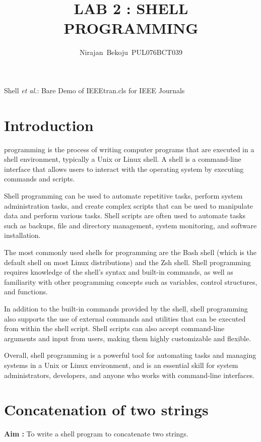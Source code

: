 \documentclass[journal,onecolumn]{IEEEtran}
\begin{document}
\title{LAB 2 : SHELL PROGRAMMING}

\author{Nirajan~Bekoju~PUL076BCT039}

%
{Shell \MakeLowercase{\textit{et al.}}: Bare Demo of IEEEtran.cls for IEEE Journals}

\maketitle

\IEEEpeerreviewmaketitle

\section{Introduction}
 programming is the process of writing computer programs that are executed in a shell environment, typically a Unix or Linux shell. A shell is a command-line interface that allows users to interact with the operating system by executing commands and scripts.

Shell programming can be used to automate repetitive tasks, perform system administration tasks, and create complex scripts that can be used to manipulate data and perform various tasks. Shell scripts are often used to automate tasks such as backups, file and directory management, system monitoring, and software installation.

The most commonly used shells for programming are the Bash shell (which is the default shell on most Linux distributions) and the Zsh shell. Shell programming requires knowledge of the shell's syntax and built-in commands, as well as familiarity with other programming concepts such as variables, control structures, and functions.

In addition to the built-in commands provided by the shell, shell programming also supports the use of external commands and utilities that can be executed from within the shell script. Shell scripts can also accept command-line arguments and input from users, making them highly customizable and flexible.

Overall, shell programming is a powerful tool for automating tasks and managing systems in a Unix or Linux environment, and is an essential skill for system administrators, developers, and anyone who works with command-line interfaces.





\section{Concatenation of two strings}
\textbf{Aim :} To write a shell program to concatenate two strings.
\end{document}
